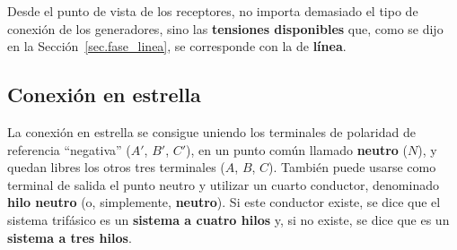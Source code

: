 \documentclass[11pt]{book} %
\begin{document}
	\begin{remark}
	    Desde el punto de vista de los receptores, no importa demasiado el tipo de conexión de los generadores, sino las \textbf{tensiones disponibles} que, como se dijo en la Sección~\ref{sec.fase_linea}, se corresponde con la de \textbf{línea}.
	\end{remark}
	
	
	\subsection{Conexión en estrella}
	La conexión en estrella se consigue uniendo los terminales de polaridad de referencia ``negativa'' ($A'$, $B'$, $C'$), en un punto común llamado \textbf{neutro} ($N$), y quedan libres los otros tres terminales ($A$, $B$, $C$). También puede usarse como terminal de salida el punto neutro y utilizar un cuarto conductor, denominado \textbf{hilo neutro} (o, simplemente, \textbf{neutro}). Si este conductor existe, se dice que el sistema trifásico es un \textbf{sistema a cuatro hilos} y, si no existe, se dice que es un \textbf{sistema a tres hilos}. 
	
\end{document}
